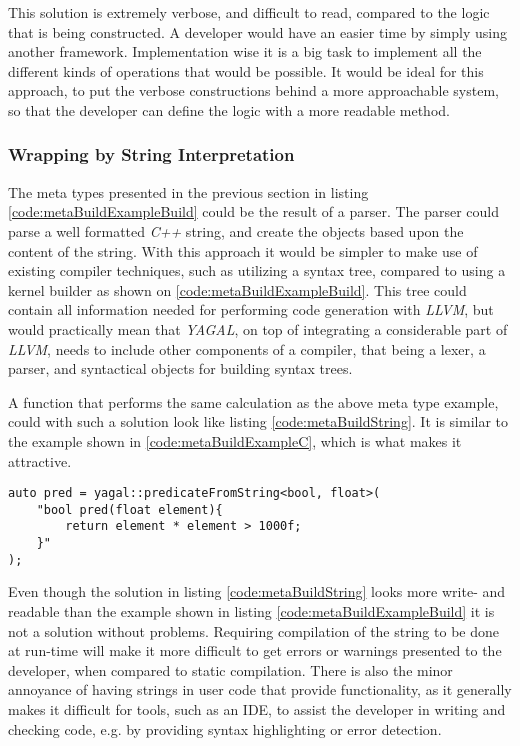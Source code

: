 This solution is extremely verbose, and difficult to read, compared to the logic that is being constructed. A developer would have an easier time by simply using another framework. Implementation wise it is a big task to implement all the different kinds of operations that would be possible. It would be ideal for this approach, to put the verbose constructions behind a more approachable system, so that the developer can define the logic with a more readable method.

\subsubsection{Wrapping by String Interpretation}
The meta types presented in the previous section in listing \ref{code:metaBuildExampleBuild} could be the result of a parser. The parser could parse a well formatted \textit{C++} string, and create the objects based upon the content of the string. With this approach it would be simpler to make use of existing compiler techniques, such as utilizing a syntax tree, compared to using a kernel builder as shown on \ref{code:metaBuildExampleBuild}. This tree could contain all information needed for performing  code generation with \textit{LLVM}, but would practically mean that \textit{YAGAL}, on top of integrating a considerable part of \textit{LLVM}, needs to include other components of a compiler, that being a lexer, a parser, and syntactical objects for building syntax trees.

A function that performs the same calculation as the above meta type example, could with such a solution look like listing \ref{code:metaBuildString}. It is similar to the example shown in \ref{code:metaBuildExampleC}, which is what makes it attractive. 

\begin{lstlisting}[caption={Code showing possible construction of kernel with string interpretation.}, label={code:metaBuildString}]
auto pred = yagal::predicateFromString<bool, float>(
    "bool pred(float element){
        return element * element > 1000f;
    }"
);
\end{lstlisting}

Even though the solution in listing \ref{code:metaBuildString} looks more write- and readable than the example shown in listing \ref{code:metaBuildExampleBuild} it is not a solution without problems. Requiring compilation of the string to be done at run-time will make it more difficult to get errors or warnings presented to the developer, when compared to static compilation. There is also the minor annoyance of having strings in user code that provide functionality, as it generally makes it difficult for tools, such as an IDE, to assist the developer in writing and checking code, e.g. by providing syntax highlighting or error detection.

